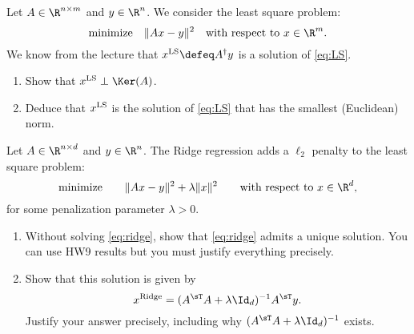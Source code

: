 \documentclass[11pt,nocut]{article}
\begin{document}






\begin{problem}[2 points]
	Let $A \in \R^{n \times m}$ and $y \in \R^n$. We consider the least square problem:
	\begin{equation}\label{eq:LS}
		\text{minimize} \quad \|Ax-y\|^2 \quad \text{with respect to} \ x \in \R^m.
	\end{equation}
	We know from the lecture that $x^{\rm LS} \defeq A^{\dagger}y$ is a solution of \eqref{eq:LS}. 
	\begin{enumerate}[label=\normalfont(\textbf{\alph*})]
		\item Show that $x^{\rm LS} \perp \Ker(A)$.
		\item Deduce that $x^{\rm LS}$ is the solution of \eqref{eq:LS} that has the smallest (Euclidean) norm.
	\end{enumerate}
\end{problem}

\vspace{4mm}

\begin{problem}[2 points]
	Let $A \in \R^{n \times d}$ and $y \in \R^n$.
	The Ridge regression adds a $\ell_2$ penalty to the least square problem:
	\begin{equation}\label{eq:ridge}
		\text{minimize} \qquad
		\| Ax - y \|^2 + \lambda \|x\|^2 \qquad \text{with respect to} \ x \in \R^d,
	\end{equation}
	for some penalization parameter $\lambda >0$.
	\begin{enumerate}[label=\normalfont(\textbf{\alph*})]
		\item Without solving \eqref{eq:ridge}, show that \eqref{eq:ridge} admits a unique solution. You can use HW9 results but you must justify everything precisely.
		\item Show that this solution is given by
		$$
		x^{\rm Ridge} = (A^{\sT} A + \lambda \Id_d)^{-1} A^{\sT} y.
		$$ 
		Justify your answer precisely, including why $(A^{\sT} A + \lambda \Id_d)^{-1}$ exists.
	\end{enumerate}
	
\end{problem}
\end{document}
